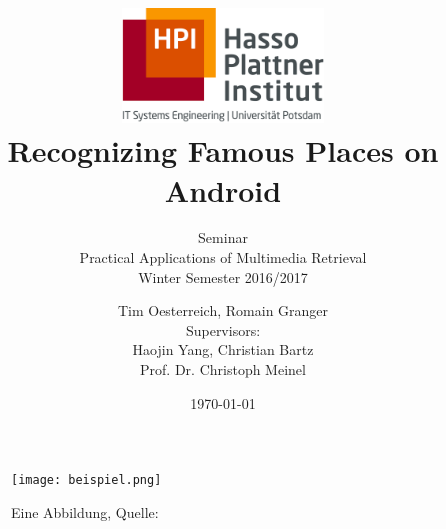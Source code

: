 \documentclass[a4paper,12pt,pagesize,headsepline,bibtotoc,titlepage]{scrartcl}
\title{
    \includegraphics*[width=0.4\textwidth]{hpi_logo.png}\\
    \vspace{24pt}
    Recognizing Famous Places on Android
}
\subtitle{
    Seminar\\
    Practical Applications of Multimedia Retrieval\\
    Winter Semester 2016/2017
}
\author{
    Tim Oesterreich, Romain Granger\\[12pt]
    Supervisors:\\
    Haojin Yang, Christian Bartz\\
    Prof. Dr. Christoph Meinel
}
\date{\today}
\begin{document}
\lstset{language=Java}
\maketitle
\tableofcontents
\newpage







\begin{figure}[hbp]
\begin{center}
\texttt{[image: beispiel.png]}\\
\caption{Eine Abbildung, Quelle: \cite{cnndroid2016}}
\label{abb:test}
\end{center}
\end{figure}

\newpage
{}

\end{document}
